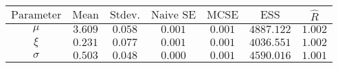 \begin{tabular}{ccccccc}
\toprule
$\textrm{Parameter}$ & $\textrm{Mean}$ & $\textrm{Stdev.}$ & $\textrm{Naive SE}$ & $\textrm{MCSE}$ & $\textrm{ESS}$ & $\hat{R}$\\
\midrule
$\mu$ & $3.609$ & $0.058$ & $0.001$ & $0.001$ & $4887.122$ & $1.002$\\
$\xi$ & $0.231$ & $0.077$ & $0.001$ & $0.001$ & $4036.551$ & $1.002$\\
$\sigma$ & $0.503$ & $0.048$ & $0.000$ & $0.001$ & $4590.016$ & $1.001$\\
\bottomrule
\end{tabular}
